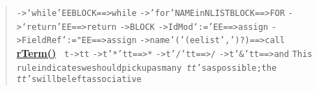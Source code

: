 {{{{{\begin{verse}
\texttt{\small \phantom{ }-\textgreater \phantom{ }‘while’\phantom{ }EE\phantom{ }BLOCK\phantom{ }==\textgreater \phantom{ }while}\mbox{}\newline
\texttt{\small \phantom{ }-\textgreater \phantom{ }'for'\phantom{ }NAME\phantom{ }in\phantom{ }NLIST\phantom{ }BLOCK\phantom{ }==\textgreater \phantom{ }FOR}\mbox{}\newline
\texttt{\small \phantom{ }-\textgreater \phantom{ }‘return’\phantom{ }EE\phantom{ }==\textgreater \phantom{ }return}\mbox{}\newline
\texttt{\small \phantom{ }-\textgreater \phantom{ }BLOCK}\mbox{}\newline
\texttt{\small \phantom{ }-\textgreater \phantom{ }IdMod\phantom{ }‘:=’\phantom{ }EE\phantom{ }==\textgreater \phantom{ }assign}\mbox{}\newline
\texttt{\small \phantom{ }-\textgreater \phantom{ }FieldRef\phantom{ }':="\phantom{ }EE\phantom{ }\phantom{ }\phantom{ }\phantom{ }\phantom{ }\phantom{ }\phantom{ }\phantom{ }\phantom{ }\phantom{ }\phantom{ }\phantom{ }\phantom{ }==\textgreater \phantom{ }assign}\mbox{}\newline
\texttt{\small \phantom{ }-\textgreater \phantom{ }name\phantom{ }'('\phantom{ }(ee\phantom{ }list\phantom{ }',')?\phantom{ })\phantom{ }==\textgreater \phantom{ }call}
\\
\hyperlink{org.openmrs.module.dssmodule.parser.Parser.rTerm()}{{\bf rTerm()}} \texttt{\small
\mbox{}\newline \phantom{ }t\phantom{ }-\textgreater \phantom{ }tt}\mbox{}\newline
\texttt{\small \phantom{ }-\textgreater \phantom{ }t\phantom{ }'*'\phantom{ }tt\phantom{ }==\textgreater \phantom{ }*}\mbox{}\newline
\texttt{\small \phantom{ }-\textgreater \phantom{ }t\phantom{ }'/'\phantom{ }tt\phantom{ }==\textgreater \phantom{ }/}\mbox{}\newline
\texttt{\small \phantom{ }-\textgreater \phantom{ }t\phantom{ }'\&'\phantom{ }tt\phantom{ }==\textgreater \phantom{ }and}\mbox{}\newline
\texttt{\small }\mbox{}\newline
\texttt{\small \phantom{ }This}\mbox{}\newline
\texttt{\small \phantom{ }rule\phantom{ }indicates\phantom{ }we\phantom{ }should\phantom{ }pick\phantom{ }up\phantom{ }as\phantom{ }many\phantom{ }\textit{ tt}'s\phantom{ }as\phantom{ }possible;\phantom{ }the}\mbox{}\newline
\texttt{\small \phantom{ }\textit{ tt}'s\phantom{ }will\phantom{ }be\phantom{ }left\phantom{ }associative}
\\
\end{verse}
}
}}}}
